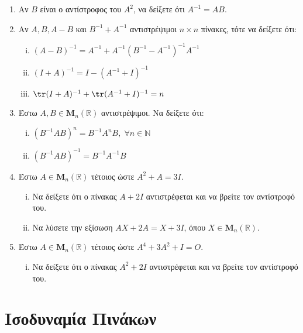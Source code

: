 \begin{enumerate}
  \item Αν $B$ είναι ο αντίστροφος του $ A^{2} $, να δείξετε ότι $ A^{-1}=AB $.

  \item Αν $ A,B,A-B $ και $ B^{-1}+A^{-1} $ αντιστρέψιμοι 
    $ n \times n $ πίνακες, τότε να δείξετε ότι:
    \begin{enumerate}[i)]
      \item $ (A-B)^{-1} = A^{-1}+A^{-1}(B^{-1}-A^{-1})^{-1}A^{-1} $
      \item $ (I+A)^{-1} = I-(A^{-1}+I)^{-1} $
      \item $\tr(I+A)^{-1} + \tr(A^{-1}+I)^{-1} = n $
    \end{enumerate}
    
  \item Έστω $ A, B \in \textbf{M}_{n}(\mathbb{R}) $ αντιστρέψιμοι. Να δείξετε ότι:
    \begin{enumerate}[i)]
      \item $ (B^{-1}AB)^{n} = B^{-1}A^{n}B, \; \forall n \in \mathbb{N} $
      \item $ (B^{-1}AB)^{-1} = B^{-1}A^{-1}B $
    \end{enumerate}

  \item Έστω $ A \in \textbf{M}_{n}(\mathbb{R}) $ τέτοιος ώστε $ A^{2}+A=3I $. 
    \begin{enumerate}[i)]
      \item Να δείξετε ότι ο πίνακας $ A+2I $ αντιστρέφεται και να βρείτε τον αντίστροφό
        του.
      \item Να λύσετε την εξίσωση $ AX+2A=X+3I $, όπου 
        $ X \in \textbf{M}_{n}(\mathbb{R}) $.
    \end{enumerate}

  \item Έστω $ A \in \textbf{M}_{n}(\mathbb{R}) $ τέτοιος ώστε $ A^{4}+3A^{2}+I=O $. 
    \begin{enumerate}[i)]
      \item Να δείξετε ότι ο πίνακας $ A^{2}+2I $ αντιστρέφεται και να βρείτε τον 
        αντίστροφό του.
    \end{enumerate}


\end{enumerate}

\section*{Ισοδυναμία Πινάκων}

